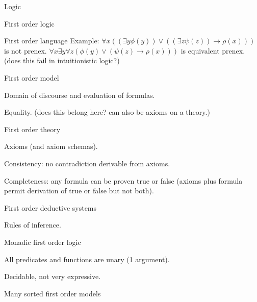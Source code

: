 \begin{plSection}{Logic}
\begin{plSection}{First order logic}
\begin{plSection}{First order language}
Example:
$\forall x 
((\exists y\phi (y))
\lor 
((\exists z\psi (z))\rightarrow \rho (x)))$ is not prenex.
$\forall x\exists y\forall z
(\phi (y)\lor (\psi (z)\rightarrow \rho (x)))$ 
is equivalent prenex. 
(does this fail in intuitionistic logic?)

\end{plSection}%
\begin{plSection}{First order model}
\label{sec:First_order_model}

Domain of discourse and evaluation of formulas.

Equality.
(does this belong here? can also be axioms on a theory.)

\end{plSection}%
\begin{plSection}{First order theory}
\label{sec:First_order_theory}

Axioms (and axiom schemas).~\cite{wiki:ListOfFirstOrderTheories}

Consistency: no contradiction derivable from axioms.

Completeness: any formula can be proven 
\textsf{true} or \textsf{false} 
(axioms plus formula permit derivation of 
\textsf{true} or \textsf{false} but not both).

\end{plSection}%
\begin{plSection}{First order deductive systems}
\label{sec:First_order_deductive_systems}

Rules of inference.

\end{plSection}%
\begin{plSection}{Monadic first order logic}
\label{sec:Monadic_first_order_logic}

All predicates and functions are unary 
(1 argument).~\cite{wiki:MonadicPredicateCalculus}

Decidable, not very expressive.

\end{plSection}%
\begin{plSection}{Many sorted first order models}
\label{sec:Many_sorted_first_order_models}


\end{plSection}
\end{plSection}
\end{plSection}
